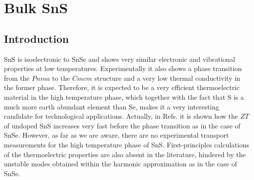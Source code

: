 
\chapter{Bulk SnS} %

\label{Chapter6} %




\section{Introduction}

SnS is isoelectronic to SnSe and shows very similar electronic and vibrational properties\cite{guo2015first} at low temperatures. Experimentally it also shows a phase transition\cite{chattopadhyay1986neutron,von1981high} from 
the $Pnma$ to the $Cmcm$ structure and a very low thermal conductivity in the former\cite{he2018remarkable,tan2014thermoelectrics} phase. Therefore, it is expected to be a very efficient thermoelectric material in the high 
temperature phase, which together with the fact that S is a much more earth abundant element than Se, makes it a very interesting candidate for technological applications. Actually, in 
Refs. \cite{he2018remarkable,tan2014thermoelectrics} it is shown how the $ZT$ of undoped SnS increases very fast before the phase transition as in the case of SnSe. However, as far as we are aware, there are no experimental 
transport measurements for the high temperature phase of SnS. First-principles calculations of the thermoelectric properties are also absent in the literature, hindered by the unstable modes obtained within the harmonic 
approximation as in the case of SnSe\cite{skelton2016anharmonicity,dewandre2016two}. \\

